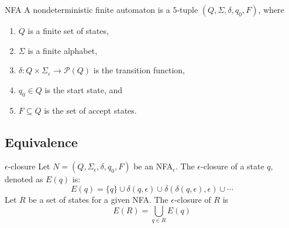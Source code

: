 \begin{Definition}{NFA}{}
	A nondeterministic finite automaton is a $5$-tuple $\left(Q, \Sigma, \delta, q_0, F\right)$, where
	\begin{enumerate}
		\item $Q$ is a finite set of states,
		\item $\Sigma$ is a finite alphabet,
		\item $\delta: Q \times \Sigma_{\varepsilon} \longrightarrow \mathcal{P}(Q)$ is the transition function,
		\item $q_0 \in Q$ is the start state, and
		\item $F \subseteq Q$ is the set of accept states.
	\end{enumerate}
\end{Definition}

\subsection{Equivalence}
\begin{Definition}{$\epsilon$-closure}{}
	Let $N = (Q, \Sigma_{\epsilon}, \delta, q_0, F)$ be an NFA$_{\epsilon}$.
	The $\epsilon$-closure of a state $q$, denoted as $E(q)$ is:
	\[
		E(q) = \{ q \} \cup \delta(q, \epsilon) \cup \delta(\delta(q, \epsilon), \epsilon) \cup \cdots
	\]
	Let $R$ be a set of states for a given NFA. The $\epsilon$-closure of $R$ is
	\[
		E(R) = \bigcup_{q \in R} E(q)
	\]
\end{Definition}
